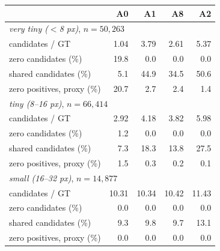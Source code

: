 \begin{tabular}{lrrrr}
\toprule
 & A0 & A1 & A8 & A2 \\
\midrule
\multicolumn{5}{l}{\textit{very tiny ($<$8 px)}{,} $n=50{,}263$} \\
\quad candidates / GT & 1.04 & 3.79 & 2.61 & 5.37 \\
\quad zero candidates (\%) & 19.8 & 0.0 & 0.0 & 0.0 \\
\quad shared candidates (\%) & 5.1 & 44.9 & 34.5 & 50.6 \\
\quad zero positives, proxy (\%) & 20.7 & 2.7 & 2.4 & 1.4 \\
\multicolumn{5}{l}{\textit{tiny (8--16 px)}{,} $n=66{,}414$} \\
\quad candidates / GT & 2.92 & 4.18 & 3.82 & 5.98 \\
\quad zero candidates (\%) & 1.2 & 0.0 & 0.0 & 0.0 \\
\quad shared candidates (\%) & 7.3 & 18.3 & 13.8 & 27.5 \\
\quad zero positives, proxy (\%) & 1.5 & 0.3 & 0.2 & 0.1 \\
\multicolumn{5}{l}{\textit{small (16--32 px)}{,} $n=14{,}877$} \\
\quad candidates / GT & 10.31 & 10.34 & 10.42 & 11.43 \\
\quad zero candidates (\%) & 0.0 & 0.0 & 0.0 & 0.0 \\
\quad shared candidates (\%) & 9.3 & 9.8 & 9.7 & 13.1 \\
\quad zero positives, proxy (\%) & 0.0 & 0.0 & 0.0 & 0.0 \\
\bottomrule
\end{tabular}
